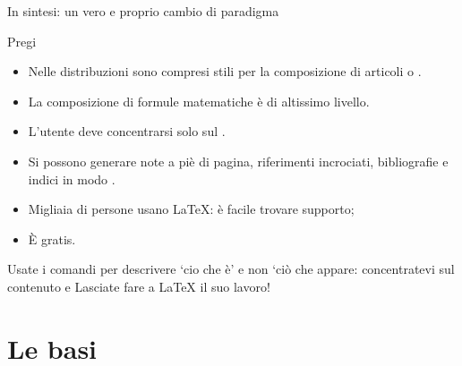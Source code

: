 \documentclass{beamer}
\begin{document}
\begin{frame}[fragile]{In sintesi: un vero e proprio cambio di paradigma}

\begin{block}{Pregi}
\begin{itemize}
	\item Nelle distribuzioni sono compresi stili per la composizione di articoli o .
	\item La composizione di \alert{formule matematiche} \`e di altissimo livello.
	\item L'utente deve concentrarsi solo sul .
	\item Si possono generare note a pi\`e di pagina, riferimenti incrociati,
	bibliografie e indici in modo .
	\item Migliaia di persone usano \LaTeX: è facile trovare supporto;
	\item \`E gratis.
\end{itemize}
\end{block}

\begin{alertblock}
{Usate i comandi per descrivere `cio che \`e' e non `ci\`o che appare: concentratevi sul contenuto e Lasciate fare a \LaTeX{} il suo lavoro!}
\end{alertblock}
\end{frame}

\section{Le basi}

\end{document}

